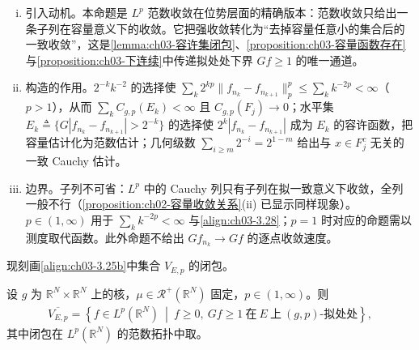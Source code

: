 \documentclass[../../main.tex]{subfiles}%
\begin{document}
\begin{remark}\label{remark:ch03-位势子列收敛}
\begin{enumerate}[(i)]
\item 引入动机。本命题是 $L^p$ 范数收敛在位势层面的精确版本：范数收敛只给出一条子列在容量意义下的收敛。它把强收敛转化为“去掉容量任意小的集合后的一致收敛”，这是\cref{lemma:ch03-容许集闭包}、\cref{proposition:ch03-容量函数存在}与\cref{proposition:ch03-下连续}中传递拟处处下界 $Gf\geqslant1$ 的唯一通道。

\item 构造的作用。$2^{-k}k^{-2}$ 的选择使 $\sum_k2^{kp}\|f_{n_k}-f_{n_{k+1}}\|_p^p\leqslant\sum_kk^{-2p}<\infty$（$p>1$），从而 $\sum_kC_{g,p}(E_k)<\infty$ 且 $C_{g,p}(F_j)\to0$；水平集 $E_k\triangleq\{G|f_{n_k}-f_{n_{k+1}}|>2^{-k}\}$ 的选择使 $2^k|f_{n_k}-f_{n_{k+1}}|$ 成为 $E_k$ 的容许函数，把容量估计化为范数估计；几何级数 $\sum_{i\geqslant m}2^{-i}=2^{1-m}$ 给出与 $x\in F_j^c$ 无关的一致 Cauchy 估计。

\item 边界。子列不可省：$L^p$ 中的 Cauchy 列只有子列在拟一致意义下收敛，全列一般不行（\cref{proposition:ch02-容量收敛关系}(ii) 已显示同样现象）。$p\in(1,\infty)$ 用于 $\sum_kk^{-2p}<\infty$ 与\eqref{align:ch03-3.28}；$p=1$ 时对应的命题需以测度取代函数。此外命题不给出 $Gf_{n_k}\to Gf$ 的逐点收敛速度。
\end{enumerate}
\end{remark}


现刻画\eqref{align:ch03-3.25b}中集合 $V_{E,p}$ 的闭包。

\begin{lemma}\label{lemma:ch03-容许集闭包}
设 $g$ 为 $\mathbb{R}^N\times\mathbb{R}^N$ 上的核，$\mu\in\mathscr{R}^+(\mathbb{R}^N)$ 固定，$p\in(1,\infty)$。则
\begin{align*}
\overline{V_{E,p}}=\left\{f\in L^p(\mathbb{R}^N)\ \middle|\ f\geqslant0,\ Gf\geqslant1\ \text{在}\ E\ \text{上}\ (g,p)\text{-拟处处}\right\},
\end{align*}
其中闭包在 $L^p(\mathbb{R}^N)$ 的范数拓扑中取。
\end{lemma}
\end{document}
